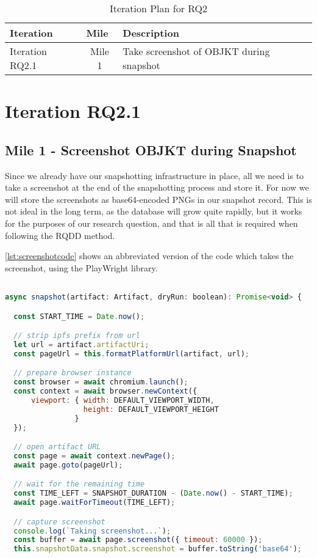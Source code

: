\begin{table}[h]
\footnotesize
\centering
\begin{tabular}{|l|c|l|}
\hline
\textbf{Iteration}        & \multicolumn{1}{l|}{\textbf{Mile}} & \textbf{Description}                                         \\ \hline
Iteration RQ2.1                  & Mile 1                              & Take screenshot of OBJKT during snapshot               \\ \hline
\end{tabular}
\caption{Iteration Plan for RQ2}
\end{table}

\section {Iteration RQ2.1}


\subsection {Mile 1 - Screenshot OBJKT during Snapshot}

Since we already have our snapshotting infrastructure in place, all we need is to take a screenshot at the end of the snapshotting process and store it. For now we will store the screenshots as base64-encoded PNGs in our snapshot record. This is not ideal in the long term, as the database will grow quite rapidly, but it works for the purposes of our research question, and that is all that is required when following the RQDD method.

\autoref{lst:screenshotcode} shows an abbreviated version of the code which takes the screenshot, using the PlayWright library.

\vspace{0.5cm}

\begin{lstlisting}[language=JavaScript, caption={OBKJT screenshot code}, label={lst:screenshotcode}] 

async snapshot(artifact: Artifact, dryRun: boolean): Promise<void> {

  const START_TIME = Date.now();

  // strip ipfs prefix from url
  let url = artifact.artifactUri;
  const pageUrl = this.formatPlatformUrl(artifact, url);

  // prepare browser instance
  const browser = await chromium.launch();
  const context = await browser.newContext({
      viewport: { width: DEFAULT_VIEWPORT_WIDTH,
                  height: DEFAULT_VIEWPORT_HEIGHT
                }
  });

  // open artifact URL
  const page = await context.newPage();
  await page.goto(pageUrl);

  // wait for the remaining time
  const TIME_LEFT = SNAPSHOT_DURATION - (Date.now() - START_TIME);
  await page.waitForTimeout(TIME_LEFT);

  // capture screenshot
  console.log(`Taking screenshot...`);
  const buffer = await page.screenshot({ timeout: 60000 });
  this.snapshotData.snapshot.screenshot = buffer.toString('base64');
\end{lstlisting}

